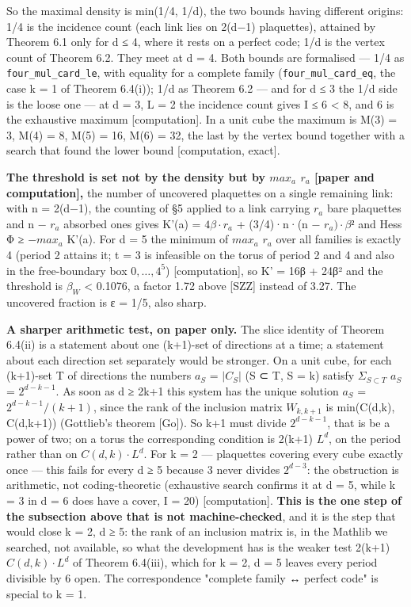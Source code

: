 \documentclass[11pt,a4paper]{article}
\theoremstyle{named}
\begin{document}
So the maximal density is min(1/4, 1/d), the two bounds having different origins: 1/4 is the incidence count (each link lies on 2(d−1) plaquettes), attained by Theorem 6.1 only for d ≤ 4, where it rests on a perfect code; 1/d is the vertex count of Theorem 6.2. They meet at d = 4. Both bounds are formalised — 1/4 as \texttt{four\_\allowbreak{}mul\_\allowbreak{}card\_\allowbreak{}le}, with equality for a complete family (\texttt{four\_\allowbreak{}mul\_\allowbreak{}card\_\allowbreak{}eq}, the case k = 1 of Theorem 6.4(i)); 1/d as Theorem 6.2 — and for d ≤ 3 the 1/d side is the loose one — at d = 3, L = 2 the incidence count gives \textbar{}I\textbar{} ≤ 6 \textless{} 8, and 6 is the exhaustive maximum [computation]. In a unit cube the maximum is M(3) = 3, M(4) = 8, M(5) = 16, M(6) = 32, the last by the vertex bound together with a search that found the lower bound [computation, exact].

\textbf{The threshold is set not by the density but by $max_a$ $r_a$ [paper and computation],} the number of uncovered plaquettes on a single remaining link: with n = 2(d−1), the counting of §5 applied to a link carrying $r_a$ bare plaquettes and n − $r_a$ absorbed ones gives K'(a) = $4β·r_a$ + (3/4)·n·(n − $r_a)·β²$ and Hess Φ ≥ $−max_a$ K'(a). For d = 5 the minimum of $max_a$ $r_a$ over all families is exactly 4 (period 2 attains it; t = 3 is infeasible on the torus of period 2 and 4 and also in the free-boundary box ${0,…,4}^5$) [computation], so K' = 16β + 24β² and the threshold is $β_W$ \textless{} 0.1076, a factor 1.72 above [SZZ] instead of 3.27. The uncovered fraction is ε = 1/5, also sharp.

\textbf{A sharper arithmetic test, on paper only.} The slice identity of Theorem 6.4(ii) is a statement about one (k+1)-set of directions at a time; a statement about each direction set separately would be stronger. On a unit cube, for each (k+1)-set T of directions the numbers $a_S$ = $|C_S|$ (S ⊂ T, \textbar{}S\textbar{} = k) satisfy $Σ_{S ⊂ T}$ $a_S$ = $2^{d−k−1}$. As soon as d ≥ 2k+1 this system has the unique solution $a_S$ = $2^{d−k−1}/(k+1)$, since the rank of the inclusion matrix $W_{k,k+1}$ is min(C(d,k), C(d,k+1)) (Gottlieb's theorem [Go]). So k+1 must divide $2^{d−k−1}$, that is be a power of two; on a torus the corresponding condition is 2(k+1) \textbar{} $L^d$, on the period rather than on $C(d,k)·L^d$. For k = 2 — plaquettes covering every cube exactly once — this fails for every d ≥ 5 because 3 never divides $2^{d−3}$: the obstruction is arithmetic, not coding-theoretic (exhaustive search confirms it at d = 5, while k = 3 in d = 6 does have a cover, \textbar{}I\textbar{} = 20) [computation]. \textbf{This is the one step of the subsection above that is not machine-checked}, and it is the step that would close k = 2, d ≥ 5: the rank of an inclusion matrix is, in the Mathlib we searched, not available, so what the development has is the weaker test 2(k+1) \textbar{} $C(d,k)·L^d$ of Theorem 6.4(iii), which for k = 2, d = 5 leaves every period divisible by 6 open. The correspondence "complete family ↔ perfect code" is special to k = 1.
\end{document}
